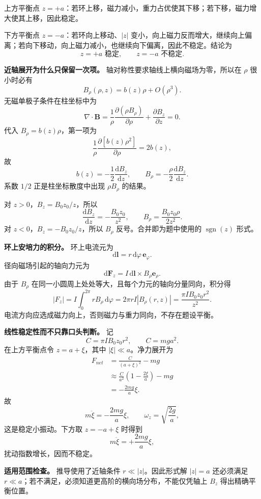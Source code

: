\documentclass[12pt,a4paper,UTF8]{ctexart}
\begin{document}
上方平衡点
\(z=+a\)：若环上移，磁力减小，重力占优使其下移；若下移，磁力增大使其上移，因此稳定。

下方平衡点 \(z=-a\)：若环向上移动、\(|z|\)
变小，向上磁力反而增大，继续向上偏离；若向下移动，向上磁力减小，也继续向下偏离，因此不稳定。结论为
\[
\boxed{z=+a\text{ 稳定},\qquad z=-a\text{ 不稳定}}. \tag{9}
\]

\textbf{近轴展开为什么只保留一次项。}
轴对称性要求轴线上横向磁场为零，所以在 \(\rho\) 很小时必有 \[
B_\rho(\rho,z)=b(z)\rho+O(\rho^3).
\] 无磁单极子条件在柱坐标中为 \[
\nabla\cdot\boldsymbol B
=\frac1\rho\frac{\partial(\rho B_\rho)}{\partial\rho}
+\frac{\partial B_z}{\partial z}=0.
\] 代入 \(B_\rho=b(z)\rho\)，第一项为 \[
\frac1\rho\frac{\partial[b(z)\rho^2]}{\partial\rho}=2b(z),
\] 故 \[
b(z)=-\frac12\frac{\mathrm dB_z}{\mathrm dz},
\qquad
B_\rho=-\frac\rho2\frac{\mathrm dB_z}{\mathrm dz}.
\] 系数 \(1/2\) 正是柱坐标散度中出现 \(\rho B_\rho\) 的结果。

对 \(z>0\)，\(B_z=B_0z_0/z\)，所以 \[
\frac{\mathrm dB_z}{\mathrm dz}=-\frac{B_0z_0}{z^2},
\qquad
B_\rho=\frac{B_0z_0\rho}{2z^2}.
\] 对 \(z<0\)，\(B_z=-B_0z_0/z\)，所以 \(B_\rho\)
反号。合并即为题中使用的 \(\operatorname{sgn}(z)\) 形式。

\textbf{环上安培力的积分。} 环上电流元为 \[
\mathrm d\boldsymbol l=r\,\mathrm d\varphi\,\boldsymbol e_\varphi.
\] 径向磁场引起的轴向力元为 \[
\mathrm d\boldsymbol F_z
=I\,\mathrm d\boldsymbol l\times B_\rho\boldsymbol e_\rho.
\] 由于 \(B_\rho\)
在同一小圆周上处处等大，且每个力元的轴向分量同向，积分得 \[
|F_z|=I\int_0^{2\pi}rB_\rho\,\mathrm d\varphi
=2\pi rI|B_\rho(r,z)|
=\frac{\pi I B_0z_0r^2}{z^2}.
\] 电流方向应选成磁力向上，否则磁力与重力同向，不存在题设平衡。

\textbf{线性稳定性而不只靠口头判断。} 记 \[
C=\pi I B_0z_0r^2,
\qquad C=mg a^2.
\] 在上方平衡点令 \(z=a+\xi\)，其中 \(|\xi|\ll a\)。净力展开为 \[
\begin{aligned}
F_{net}
&=\frac{C}{(a+\xi)^2}-mg\\
&\approx\frac{C}{a^2}\left(1-\frac{2\xi}{a}\right)-mg\\
&=-\frac{2mg}{a}\xi.
\end{aligned}
\] 故 \[
m\ddot\xi=-\frac{2mg}{a}\xi,
\qquad
\omega_z=\sqrt{\frac{2g}{a}},
\] 这是稳定小振动。下方取 \(z=-a+\xi\) 时得到 \[
m\ddot\xi=+\frac{2mg}{a}\xi,
\] 扰动指数增长，因而不稳定。

\textbf{适用范围检查。} 推导使用了近轴条件 \(r\ll |z|\)。因此形式解
\(|z|=a\) 还必须满足
\(r\ll a\)；若不满足，必须知道更高阶的横向场分布，不能仅凭轴上 \(B_z\)
得出精确平衡位置。
\end{document}
